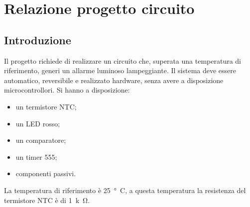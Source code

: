 \documentclass{report}
\begin{document}
\addtocounter{chapter}{+5}
	\begin{frontespizio}
		\Margini{3cm}{3cm}{3cm}{3cm}
		\Punteggiatura{}
		\begin{Preambolo*}
			\usepackage[italian]{babel}
			\usepackage[T1]{fontenc}
			\usepackage[utf8]{inputenc}
			\usepackage{microtype}
			\usepackage{lmodern}
			\graphicspath{{img/}}
			
			\renewcommand{\frontinstitutionfont}{\fontsize{14}{17}\bfseries\scshape}
			\renewcommand{\fronttitlefont}{\fontsize{17}{21}\bfseries\scshape}
			\renewcommand{\frontfootfont}{\fontsize{12}{14}\bfseries\scshape}
		\end{Preambolo*}
	\end{frontespizio}

\newpage
\null
\thispagestyle{empty}
\newpage

\chapter{Relazione progetto circuito}
\section*{Introduzione}
Il progetto richiede di realizzare un circuito che, superata una temperatura di riferimento, generi un allarme luminoso lampeggiante. Il sistema deve essere automatico, reversibile e realizzato hardware, senza avere a disposizione microcontrollori. Si hanno a disposizione:
\begin{itemize}
\item un termistore NTC;
\item un LED rosso;
\item un comparatore;
\item un timer 555;
\item componenti passivi.
\end{itemize}
La temperatura di riferimento è \SI{25}{\degree C}, a questa temperatura la resistenza del termistore NTC è di \SI{1}{k\ohm}.
\end{document}
